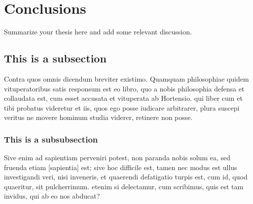 % 

\section{Conclusions}
\label{conclusions}


Summarize your thesis here and add some relevant discussion.


\subsection{This is a subsection}
Contra quos omnis dicendum breviter existimo. Quamquam philosophiae quidem vituperatoribus satis responsum est eo libro, quo a nobis philosophia defensa et collaudata est, cum esset accusata et vituperata ab Hortensio. qui liber cum et tibi probatus videretur et iis, quos ego posse iudicare arbitrarer, plura suscepi veritus ne movere hominum studia viderer, retinere non posse. 

\subsubsection{This is a subsubsection}
Sive enim ad sapientiam perveniri potest, non paranda nobis solum ea, sed fruenda etiam [sapientia] est; sive hoc difficile est, tamen nec modus est ullus investigandi veri, nisi inveneris, et quaerendi defatigatio turpis est, cum id, quod quaeritur, sit pulcherrimum. etenim si delectamur, cum scribimus, quis est tam invidus, qui ab eo nos abducat? 

